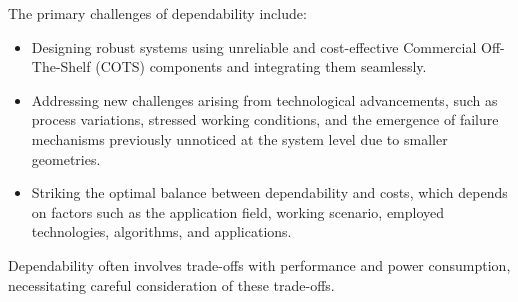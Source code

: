 The primary challenges of dependability include:
\begin{itemize}
    \item Designing robust systems using unreliable and cost-effective Commercial Off-The-Shelf (COTS) components and integrating them seamlessly.
    \item Addressing new challenges arising from technological advancements, such as process variations, stressed working conditions, and the emergence of failure mechanisms previously unnoticed at the system level due to smaller geometries.
    \item Striking the optimal balance between dependability and costs, which depends on factors such as the application field, working scenario, employed technologies, algorithms, and applications.
\end{itemize}
Dependability often involves trade-offs with performance and power consumption, necessitating careful consideration of these trade-offs.